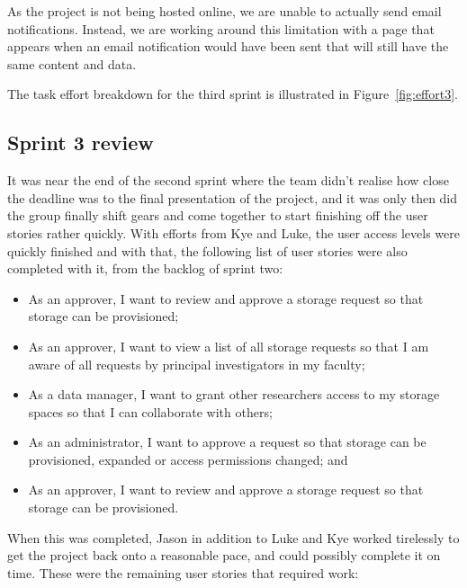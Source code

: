 \documentclass[a4paper,titlepage,12pt]{article}
\begin{document}
As the project is not being hosted online, we are unable to actually send
email notifications. Instead, we are working around this limitation with a
page that appears when an email notification would have been sent that will
still have the same content and data.

The task effort breakdown for the third sprint is illustrated in
Figure~\ref{fig:effort3}.

\subsection{Sprint 3 review}

It was near the end of the second sprint where the team didn't realise how
close the deadline was to the final presentation of the project, and it was
only then did the group finally shift gears and come together to start
finishing off the user stories rather quickly. With efforts from Kye and Luke,
the user access levels were quickly finished and with that, the following list
of user stories were also completed with it, from the backlog of sprint two:

\begin{itemize}
	\item As an approver, I want to review and approve a storage request so
	      that storage can be provisioned;
	\item As an approver, I want to view a list of all storage requests so
	      that I am aware of all requests by principal investigators in my
	      faculty;
	\item As a data manager, I want to grant other researchers access to my
	      storage spaces so that I can collaborate with others;
	\item As an administrator, I want to approve a request so that storage
	      can be provisioned, expanded or access permissions changed; and
	\item As an approver, I want to review and approve a storage request so
	      that storage can be provisioned.
\end{itemize}

When this was completed, Jason in addition to Luke and Kye worked tirelessly to
get the project back onto a reasonable pace, and could possibly complete it on
time. These were the remaining user stories that required work:
\end{document}
